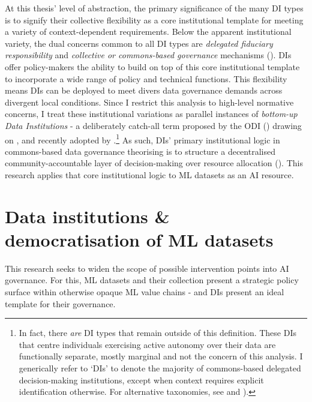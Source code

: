 At this thesis' level of abstraction, the primary significance of the many DI types is to signify their collective flexibility as a core institutional template for meeting a variety of context-dependent requirements. Below the apparent institutional variety, the dual concerns common to all DI types are \textit{delegated fiduciary responsibility} and \textit{collective or commons-based governance} mechanisms (\cite{2021HowDataInstitutionsa}). DIs offer policy-makers the ability to build on top of this core institutional template to incorporate a wide range of policy and technical functions. This flexibility means DIs can be deployed to meet divers data governance demands across divergent local conditions. Since I restrict this analysis to high-level normative concerns, I treat these institutional variations as parallel instances of \textit{bottom-up Data Institutions} - a deliberately catch-all term proposed by the ODI (\cite{2021WhatAreBottomup}) drawing on \textcite{delacroix2019BottomupDataTrusts}, and recently adopted by \textcite{DesigningTrustworthyData}.\footnote{In fact, there \textit{are} DI types that remain outside of this definition. These DIs that centre individuals exercising active autonomy over their data are functionally separate, mostly marginal and not the concern of this analysis. I generically refer to `DIs' to denote the majority of commons-based delegated decision-making institutions, except when context requires explicit identification otherwise. For alternative taxonomies, see \textcite{soni2020DataStewardshipTaxonomy} and \textcite{2021WhatAreData}).} As such, DIs' primary institutional logic in commons-based data governance theorising is to structure a decentralised community-accountable layer of decision-making over resource allocation (\cite{delacroix2020DemocratisingDigitalRevolution}). This research applies that core institutional logic to ML datasets as an AI resource.

\section*{Data institutions \& democratisation of ML datasets}

This research seeks to widen the scope of possible intervention points into AI governance. For this, ML datasets and their collection present a strategic policy surface within otherwise opaque ML value chains - and DIs present an ideal template for their governance. 

